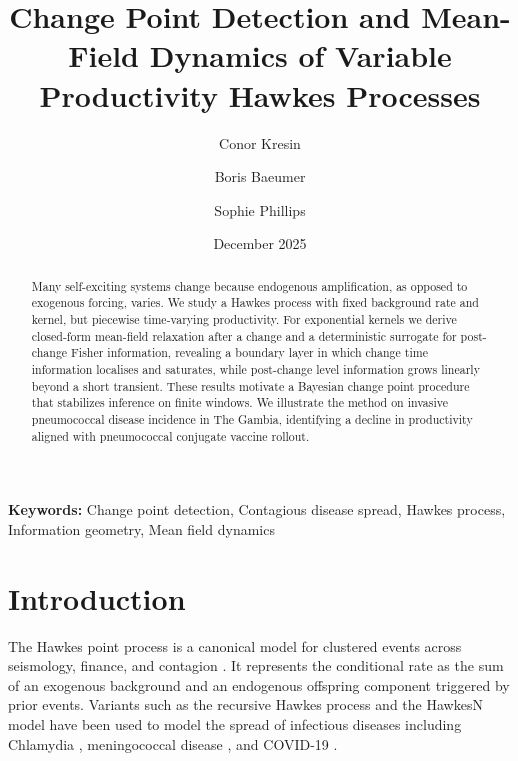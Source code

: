 \documentclass{article}
\theoremstyle{plain}
\theoremstyle{definition}
\newcommand{\1}{\mathbf{1}}
\begin{document}
\title{Change Point Detection and Mean-Field Dynamics of Variable Productivity Hawkes Processes}
\date{December 2025} 
\author[1*]{Conor Kresin}
\author[1]{Boris Baeumer}
\author[2]{Sophie Phillips}

\maketitle


 
\begin{abstract}
    Many self-exciting systems change because endogenous amplification, as opposed to exogenous forcing, varies. We study a Hawkes process with fixed background rate and kernel, but piecewise time-varying productivity. For exponential kernels we derive closed-form mean-field relaxation after a change and a deterministic surrogate for post-change Fisher information, revealing a boundary layer in which change time information localises and saturates, while post-change level information grows linearly beyond a short transient. These results motivate a Bayesian change point procedure that stabilizes inference on finite windows. We illustrate the method on invasive pneumococcal disease incidence in The Gambia, identifying a decline in productivity aligned with pneumococcal conjugate vaccine rollout.
    \end{abstract}
    
\textbf{Keywords:} Change point detection, Contagious disease spread, Hawkes process, Information geometry, Mean field dynamics

    
    
    \section{Introduction}
    
    The Hawkes point process is a canonical model for clustered events across seismology, finance, and contagion \cite{bacryHawkesProcessesFinance2015,hawkes1971spectra,ogata2006space}. It represents the conditional rate as the sum of an exogenous background and an endogenous offspring component triggered by prior events. Variants such as the recursive Hawkes process \cite{schoenberg2019recursive} and the HawkesN model \cite{rizoiu2018sir} have been used to model the spread of infectious diseases including Chlamydia \cite{paik2022nonparametric}, meningococcal disease \cite{meyerSpacetimeConditionalIntensity2012}, and COVID-19 \cite{chiang2020hawkes,garetto2021time,phillipsDetectionSurgesSARSCov22025}. 
    
\end{document}
